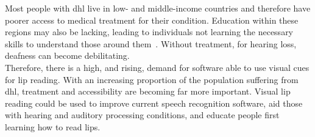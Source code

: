 Most people with \acrshort{dhl} live in low- and middle-income countries \cite{WHO_deafness_stats} and therefore have poorer access to medical treatment for their condition. Education within these regions may also be lacking, leading to individuals not learning the necessary skills to understand those around them~\cite{cochlear_implants_low_income, Disability_in_low-income...}. Without treatment, for hearing loss, deafness can become debilitating.\\
Therefore, there is a high, and rising, demand for software able to use visual cues for lip reading. With an increasing proportion of the population suffering from \acrshort{dhl}, treatment and accessibility are becoming far more important. Visual lip reading could be used to improve current speech recognition software, aid those with hearing and auditory processing conditions, and educate people first learning how to read lips.

